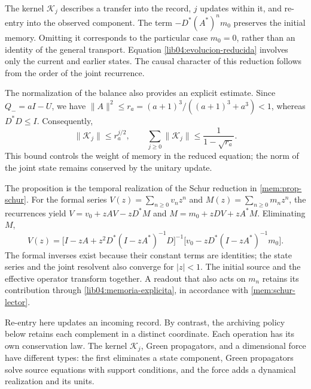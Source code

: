 The kernel \(\mathscr K_j\) describes a transfer into the record,
\(j\) updates within it, and re-entry into the observed component.
The term \(-D^*(A^*)^nm_0\) preserves the initial memory. Omitting it
corresponds to the particular case \(m_0=0\), rather than an identity of
the general transport. Equation \eqref{lib04:evolucion-reducida} involves
only the current and earlier states. The causal character of this reduction
follows from the order of the joint recurrence.

The normalization of the balance also provides an explicit estimate.
Since \(Q_-=aI-U\), we have
\(\|A\|^2\leq r_a=(a+1)^3/((a+1)^3+a^3)<1\), whereas
\(D^*D\leq I\). Consequently,
\begin{equation}
 \|\mathscr K_j\|\leq r_a^{j/2},\qquad
 \sum_{j\geq0}\|\mathscr K_j\|
 \leq\frac{1}{1-\sqrt{r_a}}.
 \label{lib04:cota-nucleo-retardo}
\end{equation}
This bound controls the weight of memory in the reduced equation; the norm
of the joint state remains conserved by the unitary update.

The proposition is the temporal realization of the Schur reduction in
\cref{mem:prop-schur}. For the formal series
\(V(z)=\sum_{n\geq0}v_nz^n\) and
\(M(z)=\sum_{n\geq0}m_nz^n\), the recurrences yield
\(V=v_0+zAV-zD^*M\) and \(M=m_0+zDV+zA^*M\). Eliminating \(M\),
\begin{equation}
 V(z)=\bigl[I-zA+z^2D^*(I-zA^*)^{-1}D\bigr]^{-1}
       \bigl[v_0-zD^*(I-zA^*)^{-1}m_0\bigr].
 \label{lib04:schur-bilateral}
\end{equation}
The formal inverses exist because their constant terms are identities;
the state series and the joint resolvent also converge for \(|z|<1\).
The initial source and the effective operator transform together. A readout
that also acts on \(m_n\) retains its contribution through
\eqref{lib04:memoria-explicita}, in accordance with \eqref{mem:schur-lector}.

Re-entry here updates an incoming record. By contrast, the archiving policy
below retains each complement in a distinct coordinate. Each operation has
its own conservation law. The kernel \(\mathscr K_j\), Green propagators,
and a dimensional force have different types: the first eliminates a state
component, Green propagators solve source equations with support conditions, and
the force adds a dynamical realization and its units.
